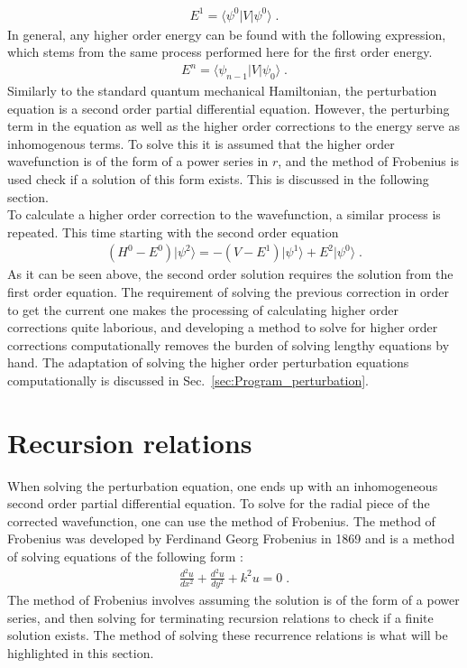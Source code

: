         \begin{align}
            E^1 = \langle \psi^0 \vert V \vert \psi^0 \rangle\;.\label{eq:Energy0_Perturbation}
        \end{align}
        \noindent In general, any higher order energy can be found with the following expression, which stems from the same process performed here for the first order energy.
        \begin{align}
            E^n = \langle \psi_{n-1} \vert V \vert \psi_0 \rangle\;. \label{eq:Energy_Perturbation}
        \end{align}
        \noindent Similarly to the standard quantum mechanical Hamiltonian, the perturbation equation is a second order partial differential equation. However, the perturbing term in the equation as well as the higher order corrections to the energy serve as inhomogenous terms. To solve this it is assumed that the higher order wavefunction is of the form of a power series in $r$, and the method of Frobenius is used check if a solution of this form exists. This is discussed in the following section.\\ 

        To calculate a higher order correction to the wavefunction, a similar process is repeated. This time starting with the second order equation
        \begin{align}
            \left( H^0 - E^0 \right) \vert \psi^2 \rangle = -\left(V - E^1 \right) \vert \psi^1 \rangle + E^2 \vert \psi^0 \rangle\;.
        \end{align}
        \noindent As it can be seen above, the second order solution requires the solution from the first order equation. The requirement of solving the previous correction in order to get the current one makes the processing of calculating higher order corrections quite laborious, and developing a method to solve for higher order corrections computationally removes the burden of solving lengthy equations by hand. The adaptation of solving the higher order perturbation equations computationally is discussed in Sec.~\ref{sec:Program_perturbation}.

    \section{Recursion relations} \label{sec:Recursion_Relations}
        When solving the perturbation equation, one ends up with an inhomogeneous second order partial differential equation. To solve for the radial piece of the corrected wavefunction, one can use the method of Frobenius. The method of Frobenius was developed by Ferdinand Georg Frobenius in 1869 and is a method of solving equations of the following form \cite{Weber1869}:
        \begin{align}
            \frac{d^2 u}{dx^2} + \frac{d^2 u}{dy^2} + k^2 u = 0\;.
        \end{align}
        \noindent The method of Frobenius involves assuming the solution is of the form of a power series, and then solving for terminating recursion relations to check if a finite solution exists. The method of solving these recurrence relations is what will be highlighted in this section. \\

